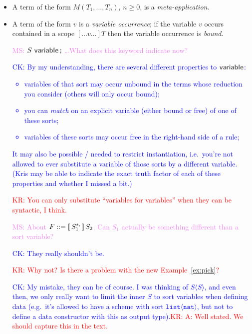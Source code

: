 \documentclass[letterpaper,11pt]{article}
\newcommand{\CK}[1]{\textcolor{blue}{CK: #1}}
\newcommand{\KR}[1]{\textcolor{red}{KR: #1}}
\newcommand{\MS}[1]{\textcolor{violet}{MS: #1}}
\begin{document}
\begin{itemize}
  \CK{For an entirely different suggestion, you could use different non-metavariable notation
    for the catcher metavariables, e.g.~$\sharp$1 or \&1.}

\item A term of the form $M(T_1,…,T_n)$, $n≥0$, is a \emph{meta-application}.

\item A term of the form $v$ is a \emph{variable occurrence}; if the variable $v$ occurs contained
  in a scope $[…v…]T$ then the variable occurrence is \emph{bound}.

\MS{$S~\kw{variable}\,\kw;$ \ldots What does this keyword indicate now?}

\CK{By my understanding, there are several different properties to $\kw{variable}$:
  \begin{itemize}
  \item variables of that sort may occur unbound in the terms whose reduction
    you consider (others will only occur bound);
  \item you can \emph{match} on an explicit variable (either bound or free) of one of
    these sorts;
  \item variables of these sorts may occur free in the right-hand side of a
    rule;
  \end{itemize}
  It may also be possible / needed to restrict instantiation, i.e.~you're not
  allowed to ever substitute a variable of those sorts by a different variable. \\
  (Kris may be able to indicate the exact truth factor of each of these
  properties and whether I missed a bit.)
}
\KR{You can only substitute ``variables for variables'' when they can be syntactic, I think.}

\MS{About $F ::= \kw[\,S_1^{*\kw,}\,\kw]\,S_2$. Can $S_1$ actually be something different than a sort variable?}

\CK{They really shouldn't be.}

\KR{Why not? Is there a problem with the new Example~\ref{ex:pick}?}

\CK{My mistake, they can be of course. I was thinking of $S\langle S\rangle$, and even then, we
only really want to limit the inner $S$ to sort variables when defining data (e.g.~it's allowed
to have a scheme with sort $\mathtt{list}\langle\mathtt{nat}\rangle$, but not to define a data
constructor with this as output type).}\KR{A: Well stated. We should capture this in the text.}

\end{itemize}
\end{document}

